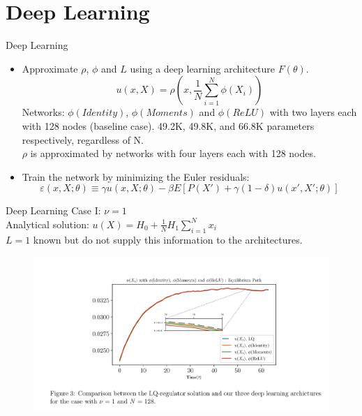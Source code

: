 \documentclass[dvipsnames,mathserif]{beamer}
\begin{document}
{\section{Deep Learning}
\begin{frame}{Deep Learning}
    \begin{itemize}
        \item Approximate $\rho$, $\phi$ and $L$ using a deep learning architecture $F(\theta)$.
        \[u(x,X) = \rho(x,\frac{1}{N}\sum_{i=1}^{N}\phi(X_i))\]
        Networks: $\phi(Identity)$, $\phi(Moments)$ and $\phi(ReLU)$ with two layers each with 128 nodes (baseline case). 49.2K, 49.8K, and 66.8K parameters respectively, regardless of N.\\
        $\rho$ is approximated by networks with four layers each with 128 nodes.
        \vspace{0.1cm}
        \item Train the network by minimizing the Euler residuals:
        \[\varepsilon(x,X;\theta) \equiv \gamma u(x,X;\theta) - \beta E[P(X') + \gamma (1-\delta)u(x',X';\theta)]\]
    \end{itemize}
\end{frame}



\begin{frame}{Deep Learning}
Case I: $\nu = 1$\\
Analytical solution: $u(X) = H_0 + \frac{1}{N}H_1\sum_{i=1}^{N}x_i$\\
$L=1$ known but do not supply this information to the architectures.
\begin{figure}[h!]
\centering
\includegraphics[width = \textwidth]{3.png}
\end{figure}
\end{frame}

}
\end{document}
